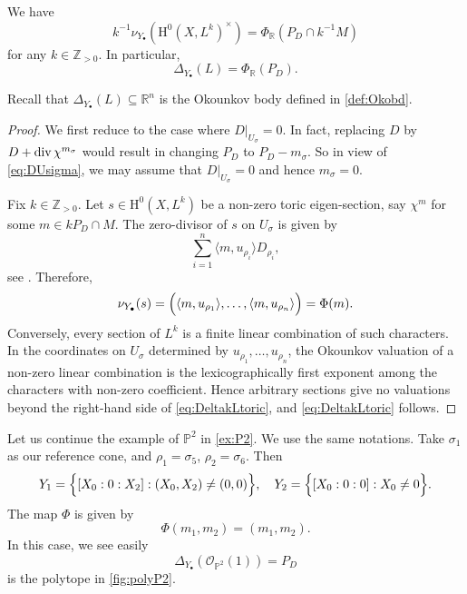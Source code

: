 \begin{proposition}\label{prop:toricusualOko}
    We have
    \begin{equation}\label{eq:DeltakLtoric}
        k^{-1}\nu_{Y_{\bullet}}\left(\mathrm{H}^0(X,L^k)^{\times} \right)=\Phi_{\mathbb{R}} \left(P_{D}\cap k^{-1}M\right)
    \end{equation}
    for any $k\in \mathbb{Z}_{>0}$.
    In particular,
    \begin{equation}
        \Delta_{Y_{\bullet}}(L)=\Phi_{\mathbb{R}}(P_D).
    \end{equation}
\end{proposition}
Recall that $\Delta_{Y_{\bullet}}(L)\subseteq \mathbb{R}^n$ is the Okounkov body defined in \cref{def:Okobd}.
\begin{proof}
    We first reduce to the case where $D|_{U_{\sigma}}=0$. In fact, replacing $D$ by $D+\operatorname{div} \chi^{m_{\sigma}}$ would result in changing $P_D$ to $P_D-m_{\sigma}$. So in view of \eqref{eq:DUsigma}, we may assume that $D|_{U_{\sigma}}=0$ and hence $m_{\sigma}=0$.

    Fix $k\in \mathbb{Z}_{>0}$. Let $s\in \mathrm{H}^0(X,L^k)$ be a non-zero toric eigen-section, say $\chi^m$ for some $m\in kP_D\cap M$. The zero-divisor of $s$ on $U_{\sigma}$ is given by
    \[
        \sum_{i=1}^n \langle m, u_{\rho_i} \rangle D_{\rho_i},
    \]
    see \cite[Proposition~4.1.2]{CLS11}.
    Therefore,
    \[
    \nu_{Y_{\bullet}}(s)=\Bigl(\langle m, u_{\rho_1} \rangle,\dots,\langle m, u_{\rho_n} \rangle \Bigr)=\Phi(m).
    \]
    Conversely, every section of $L^k$ is a finite linear combination of such characters. In the coordinates on $U_{\sigma}$ determined by $u_{\rho_1},\ldots,u_{\rho_n}$, the Okounkov valuation of a non-zero linear combination is the lexicographically first exponent among the characters with non-zero coefficient. Hence arbitrary sections give no valuations beyond the right-hand side of \eqref{eq:DeltakLtoric}, and \eqref{eq:DeltakLtoric} follows.
\end{proof}


\begin{example}\label{ex:OkounP2}
    Let us continue the example of $\mathbb{P}^2$ in \cref{ex:P2}. We use the same notations. Take $\sigma_1$ as our reference cone, and $\rho_1=\sigma_5$, $\rho_2=\sigma_6$. Then
    \[
    Y_1=\Bigl\{[X_0:0:X_2]:(X_0,X_2)\neq (0,0) \Bigr\},\quad Y_2=\Bigl\{[X_0:0:0]:X_0\neq 0\Bigr\}.
    \]
    The map $\Phi$ is given by
    \[
    \Phi(m_1,m_2)=(m_1,m_2).
    \]
    In this case, we see easily
    \[
    \Delta_{Y_{\bullet}}\left(\mathcal{O}_{\mathbb{P}^2}(1)\right)=P_D
    \]
    is the polytope in \cref{fig:polyP2}.
\end{example}

